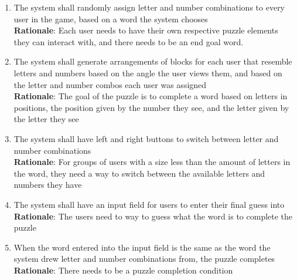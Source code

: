 \documentclass[12pt]{article}
\begin{document}
\begin{enumerate}[label=IP\arabic*., series=IsometricPuzzle ]
        \item The system shall randomly assign letter and number combinations to every user in the game, based on a word the system chooses \\
        \textbf{Rationale}: Each user needs to have their own respective puzzle elements they can interact with, and there needs to be an end goal word. 
        \item The system shall generate arrangements of blocks for each user that resemble letters and numbers based on the angle the user views them, and based on the letter and number combos each user was assigned \\
        \textbf{Rationale}: The goal of the puzzle is to complete a word based on letters in positions, the position given by the number they see, and the letter given by the letter they see
        \item The system shall have left and right buttons to switch between letter and number combinations \\
        \textbf{Rationale}: For groups of users with a size less than the amount of letters in the word, they need a way to switch between the available letters and numbers they have
        \item The system shall have an input field for users to enter their final guess into \\
        \textbf{Rationale}: The users need to way to guess what the word is to complete the puzzle
        \item When the word entered into the input field is the same as the word the system drew letter and number combinations from, the puzzle completes\\
        \textbf{Rationale}: There needs to be a puzzle completion condition
\end{enumerate}
\end{document}
